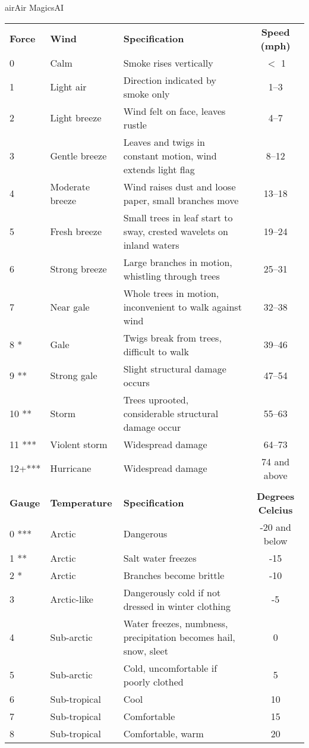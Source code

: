 \begin{college}[2.1]{air}{Air Magics}{AI}
\begin{table*}
\begin{tabularx}{\linewidth}{llXc}
\textbf{Force} & \textbf{Wind} & \textbf{Specification}	& \textbf{Speed (mph)} \\
0	& Calm		& Smoke rises vertically	& $<$ 1 \\
1	& Light air	& Direction indicated by smoke only & 1--3 \\
2	& Light breeze	& Wind felt on face, leaves rustle & 4--7 \\
3	& Gentle breeze & Leaves and twigs in constant motion, wind extends light flag & 8--12 \\
4	& Moderate breeze & Wind raises dust and loose paper, small branches move & 13--18 \\
5	& Fresh breeze	& Small trees in leaf start to sway, crested wavelets on inland waters & 19--24 \\
6	& Strong breeze	& Large branches in motion, whistling through trees & 25--31 \\
7	& Near gale	& Whole trees in motion, inconvenient to walk against wind & 32--38 \\
8 *	& Gale		& Twigs break from trees, difficult to walk & 39--46 \\
9  **	& Strong gale	& Slight structural damage occurs	& 47--54 \\
10 **	& Storm		& Trees uprooted, considerable structural damage occur & 55--63 \\
11 ***	& Violent storm	& Widespread damage		& 64--73 \\
12+***	& Hurricane	& Widespread damage		& 74 and above \\
\\
\textbf{Gauge} & \textbf{Temperature} & \textbf{Specification} & \textbf{Degrees Celcius} \\
0  ***	& Arctic	& Dangerous	& -20 and below \\
1  **	& Arctic	& Salt water freezes & -15 \\
2  *	& Arctic	& Branches become brittle & -10 \\
3	& Arctic-like	& Dangerously cold if not dressed in winter clothing & -5 \\
4	& Sub-arctic	& Water freezes, numbness, precipitation becomes hail, snow, sleet & 0 \\
5	& Sub-arctic	& Cold, uncomfortable if poorly clothed & 5 \\
6	& Sub-tropical	& Cool	& 10 \\
7	& Sub-tropical	& Comfortable & 15 \\
8	& Sub-tropical	& Comfortable, warm & 20 \\

\end{tabularx}
\end{table*}
\end{college}

